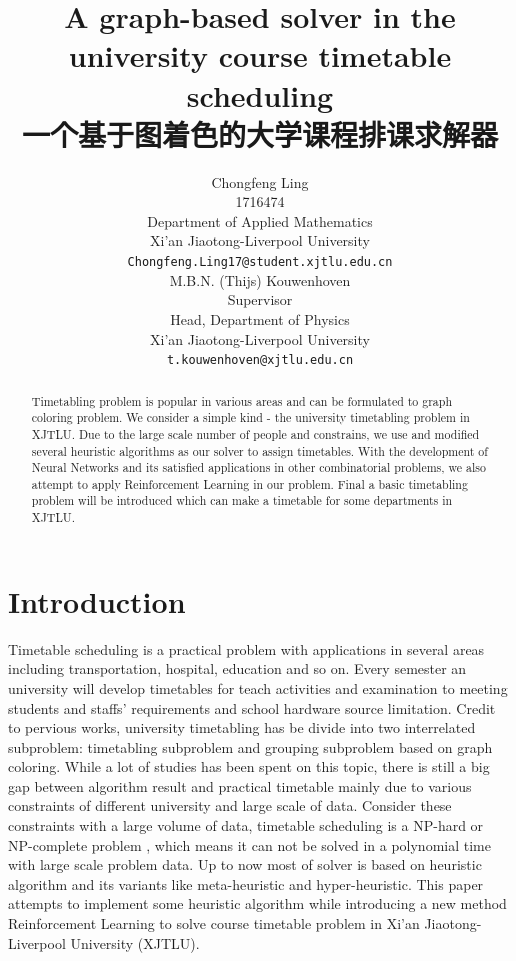\documentclass{article}
\title{A graph-based solver in the university course timetable scheduling\\
一个基于图着色的大学课程排课求解器}
\author{ \hspace{1mm}Chongfeng Ling \\
	1716474\\
	Department of Applied Mathematics\\
	Xi'an Jiaotong-Liverpool University\\
	\texttt{Chongfeng.Ling17@student.xjtlu.edu.cn} \\
	\And
	M.B.N. (Thijs) Kouwenhoven \\
	Supervisor \\
	Head, Department of Physics \\
	Xi'an Jiaotong-Liverpool University\\
	\texttt{t.kouwenhoven@xjtlu.edu.cn} \\
}
\begin{document}
\maketitle



\newpage
\tableofcontents
\newpage

\begin{abstract}
	Timetabling problem is popular in various areas and can be formulated to graph coloring problem. We consider a simple kind - the university timetabling problem in XJTLU. Due to the large scale number of people and constrains, we use and modified several heuristic algorithms as our solver to assign timetables. With the development of Neural Networks and its satisfied applications in other combinatorial problems, we also attempt to apply Reinforcement Learning in our problem. Final a basic timetabling problem will be introduced which can make a timetable for some departments in XJTLU.
\end{abstract}

\newpage

\section{Introduction}

Timetable scheduling is a practical problem with applications in several areas including transportation, hospital, education and so on. Every semester an university will develop timetables for teach activities and examination to meeting students and staffs' requirements and school hardware source limitation. Credit to pervious works, university timetabling has be divide into two interrelated subproblem: timetabling subproblem and grouping subproblem based on graph coloring\citep{(hertz1991)tabu}. While a lot of studies has been spent on this topic, there is still a big gap between algorithm result and practical timetable \citep{(mccollum2006)perspective} mainly due to various constraints of different university and large scale of data. Consider these constraints with a large volume of data, timetable scheduling is a NP-hard or NP-complete problem \citep{(even1975)complexity}, which means it can not be solved in a polynomial time with large scale problem data. Up to now most of solver is based on heuristic algorithm and its variants like meta-heuristic and hyper-heuristic. This paper attempts to implement some heuristic algorithm while introducing a new method Reinforcement Learning to solve course timetable problem in Xi'an Jiaotong-Liverpool University (XJTLU).
\end{document}

